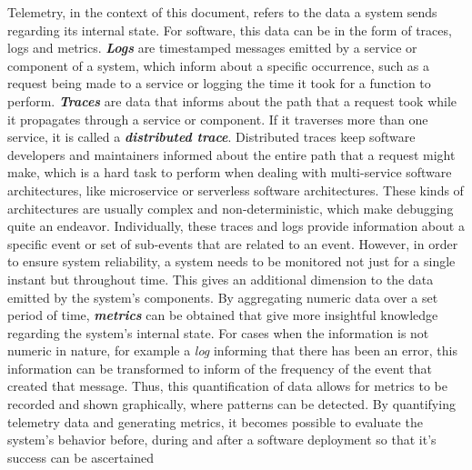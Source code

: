 Telemetry, in the context of this document, refers to the data a system sends regarding its internal state. For software, this data can be in the form of traces, logs and metrics.
\textbf{\textit{Logs}} are timestamped messages emitted by a service or component of a system, which inform about a specific occurrence, such as a request being made to a service or logging the time it took for a function to perform.
\textbf{\textit{Traces}} are data that informs about the path that a request took while it propagates through a service or component. If it traverses more than one service, it is called a \textbf{\textit{distributed trace}}. Distributed traces keep software developers and maintainers informed about the entire path that a request might make, which is a hard task to perform when dealing with multi-service software architectures, like microservice or serverless software architectures. These kinds of architectures are usually complex and non-deterministic, which make debugging quite an endeavor. Individually, these traces and logs provide information about a specific event or set of sub-events that are related to an event. However, in order to ensure system reliability, a system needs to be monitored not just for a single instant but throughout time. This gives an additional dimension to the data emitted by the system's components. By aggregating numeric data over a set period of time, \textbf{\textit{metrics}} can be obtained that give more insightful knowledge regarding the system's internal state. For cases when the information is not numeric in nature, for example a \textit{log} informing that there has been an error, this information can be transformed to inform of the frequency of the event that created that message. Thus, this quantification of data allows for metrics to be recorded and shown graphically, where patterns can be detected. By quantifying telemetry data and generating metrics, it becomes possible to evaluate the system's behavior before, during and after a software deployment so that it's success can be ascertained~\Parencite{mills1988software}
